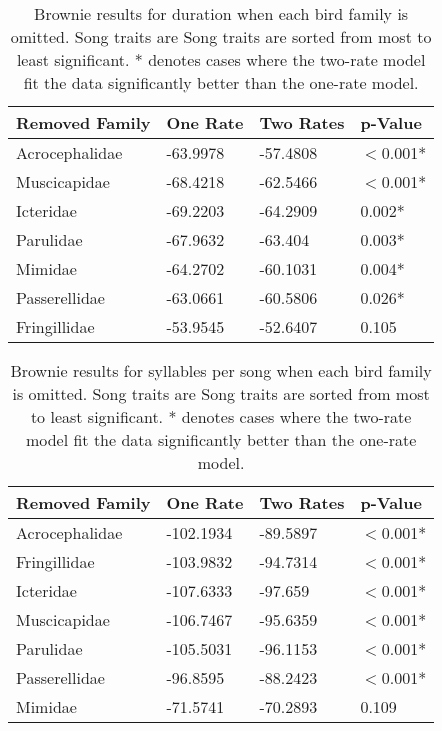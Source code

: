 \documentclass[a4paper,12pt]{article}
\begin{document}
\begin{table}[ht]
\caption{Brownie results for duration when each bird family is omitted. Song traits are Song traits are sorted from most to least significant. * denotes cases where the two-rate model fit the data significantly better than the one-rate model.}
\centering
\begin{tabular}{llll}
  \hline
Removed Family & One Rate & Two Rates & p-Value \\ 
  \hline
Acrocephalidae & -63.9978 & -57.4808 & $<$0.001* \\ 
  Muscicapidae & -68.4218 & -62.5466 & $<$0.001* \\ 
  Icteridae & -69.2203 & -64.2909 & 0.002* \\ 
  Parulidae & -67.9632 & -63.404 & 0.003* \\ 
  Mimidae & -64.2702 & -60.1031 & 0.004* \\ 
  Passerellidae & -63.0661 & -60.5806 & 0.026* \\ 
  Fringillidae & -53.9545 & -52.6407 & 0.105 \\ 
   \hline
\end{tabular}
\end{table}
\begin{table}[ht]
\caption{Brownie results for syllables per song when each bird family is omitted. Song traits are Song traits are sorted from most to least significant. * denotes cases where the two-rate model fit the data significantly better than the one-rate model.}
\centering
\begin{tabular}{llll}
  \hline
Removed Family & One Rate & Two Rates & p-Value \\ 
  \hline
Acrocephalidae & -102.1934 & -89.5897 & $<$0.001* \\ 
  Fringillidae & -103.9832 & -94.7314 & $<$0.001* \\ 
  Icteridae & -107.6333 & -97.659 & $<$0.001* \\ 
  Muscicapidae & -106.7467 & -95.6359 & $<$0.001* \\ 
  Parulidae & -105.5031 & -96.1153 & $<$0.001* \\ 
  Passerellidae & -96.8595 & -88.2423 & $<$0.001* \\ 
  Mimidae & -71.5741 & -70.2893 & 0.109 \\ 
   \hline
\end{tabular}
\end{table}
\end{document}
